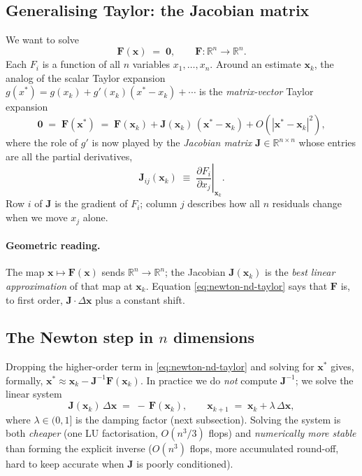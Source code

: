 \documentclass[11pt,a4paper]{article}
\newcommand{\R}{\mathbb{R}}
\newcommand{\xv}{\mathbf{x}}
\newcommand{\Fv}{\mathbf{F}}
\newcommand{\Jac}{\mathbf{J}}
\begin{document}
\subsection{Generalising Taylor: the Jacobian matrix}

We want to solve
\begin{equation}
   \Fv(\xv) \;=\; \mathbf{0}, \qquad \Fv \colon \R^n \to \R^n.
   \label{eq:newton-nd-system}
\end{equation}
Each $F_i$ is a function of all $n$ variables $x_1, \dots, x_n$.
Around an estimate $\xv_k$, the analog of the scalar Taylor expansion
$g(x^{\!*}) = g(x_k) + g'(x_k)(x^{\!*} - x_k) + \cdots$ is the
\emph{matrix-vector} Taylor expansion
\begin{equation}
   \mathbf{0} \;=\; \Fv(\xv^{\!*})
   \;=\; \Fv(\xv_k) + \Jac(\xv_k)\,(\xv^{\!*} - \xv_k) + O(|\xv^{\!*} - \xv_k|^2),
   \label{eq:newton-nd-taylor}
\end{equation}
where the role of $g'$ is now played by the \emph{Jacobian matrix}
$\Jac \in \R^{n\times n}$ whose entries are all the partial
derivatives,
\begin{equation}
   \Jac_{ij}(\xv_k) \;\equiv\; \left.\frac{\partial F_i}{\partial x_j}\right|_{\xv_k}.
   \label{eq:newton-nd-jacobian}
\end{equation}
Row $i$ of $\Jac$ is the gradient of $F_i$; column $j$ describes how
all $n$ residuals change when we move $x_j$ alone.

\paragraph{Geometric reading.}  The map $\xv \mapsto \Fv(\xv)$ sends
$\R^n \to \R^n$; the Jacobian $\Jac(\xv_k)$ is the \emph{best linear
approximation} of that map at $\xv_k$.  Equation
\eqref{eq:newton-nd-taylor} says that $\Fv$ is, to first order,
$\Jac \cdot \Delta\xv$ plus a constant shift.

\subsection{The Newton step in $n$ dimensions}

Dropping the higher-order term in \eqref{eq:newton-nd-taylor} and
solving for $\xv^{\!*}$ gives, formally,
$\xv^{\!*} \approx \xv_k - \Jac^{-1}\Fv(\xv_k)$.  In practice we do
\emph{not} compute $\Jac^{-1}$; we solve the linear system
\begin{equation}
   \boxed{\;
   \Jac(\xv_k)\,\Delta\xv \;=\; -\,\Fv(\xv_k),
   \qquad
   \xv_{k+1} \;=\; \xv_k + \lambda \, \Delta\xv,
   \;}
   \label{eq:newton-nd}
\end{equation}
where $\lambda \in (0,1]$ is the damping factor (next subsection).
Solving the system is both \emph{cheaper} (one LU factorisation,
$O(n^3/3)$ flops) and \emph{numerically more stable} than forming
the explicit inverse ($O(n^3)$ flops, more accumulated round-off,
hard to keep accurate when $\Jac$ is poorly conditioned).
\end{document}

